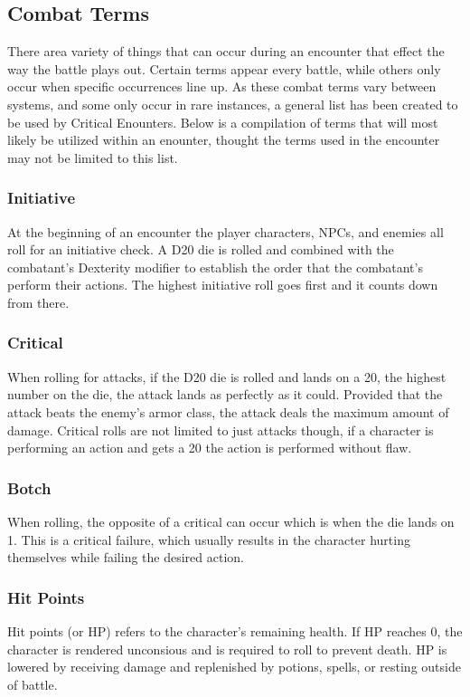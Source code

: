 \documentclass[12pt,a4paper]{report}
\begin{document}
		\subsection{Combat Terms}
			There area variety of things that can occur during an encounter that effect the way the battle plays out. Certain terms appear every battle, while others only occur when specific occurrences line up. As these combat terms vary between systems, and some only occur in rare instances, a general list has been created to be used by Critical Enounters. Below is a compilation of terms that will most likely be utilized within an enounter, thought the terms used in the encounter may not be limited to this list.
		\subsubsection{Initiative}
			At the beginning of an encounter the player characters, NPCs, and enemies all roll for an initiative check. A D20 die is rolled and combined with the combatant's Dexterity modifier to establish the order that the combatant's perform their actions. The highest initiative roll goes first and it counts down from there.
		\subsubsection{Critical}
			When rolling for attacks, if the D20 die is rolled and lands on a 20, the highest number on the die, the attack lands as perfectly as it could. Provided that the attack beats the enemy's armor class, the attack deals the maximum amount of damage. Critical rolls are not limited to just attacks though, if a character is performing an action and gets a 20 the action is performed without flaw.
		\subsubsection{Botch}
			When rolling, the opposite of a critical can occur which is when the die lands on 1. This is a critical failure, which usually results in the character hurting themselves while failing the desired action.
		\subsubsection{Hit Points}
			Hit points (or HP) refers to the character's remaining health. If HP reaches 0, the character is rendered unconsious and is required to roll to prevent death. HP is lowered by receiving damage and replenished by potions, spells, or resting outside of battle.
\end{document}
